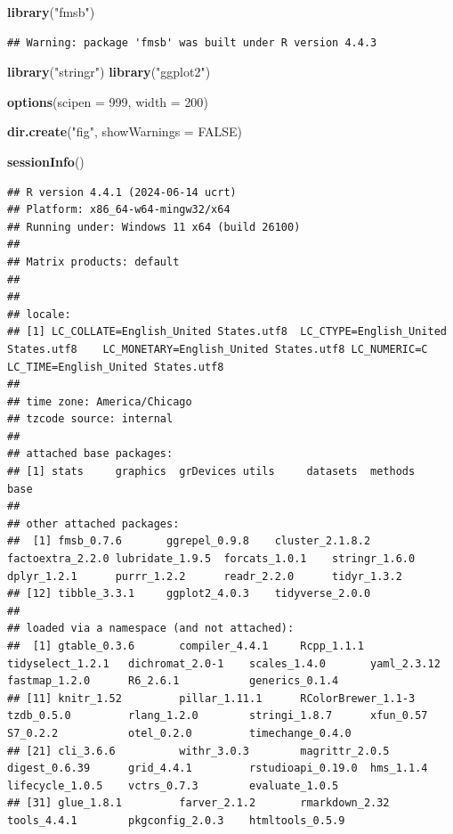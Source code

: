\documentclass[
]{article}
\newenvironment{Shaded}{\begin{snugshade}}{\end{snugshade}}
\newcommand{\AttributeTok}[1]{\textcolor[rgb]{0.13,0.29,0.53}{#1}}
\newcommand{\ConstantTok}[1]{\textcolor[rgb]{0.56,0.35,0.01}{#1}}
\newcommand{\DecValTok}[1]{\textcolor[rgb]{0.00,0.00,0.81}{#1}}
\newcommand{\FunctionTok}[1]{\textcolor[rgb]{0.13,0.29,0.53}{\textbf{#1}}}
\newcommand{\NormalTok}[1]{#1}
\newcommand{\StringTok}[1]{\textcolor[rgb]{0.31,0.60,0.02}{#1}}
\begin{document}
\begin{Shaded}
\begin{Highlighting}[]
\FunctionTok{library}\NormalTok{(}\StringTok{"fmsb"}\NormalTok{)}
\end{Highlighting}
\end{Shaded}

\begin{verbatim}
## Warning: package 'fmsb' was built under R version 4.4.3
\end{verbatim}

\begin{Shaded}
\begin{Highlighting}[]
\FunctionTok{library}\NormalTok{(}\StringTok{"stringr"}\NormalTok{)}
\FunctionTok{library}\NormalTok{(}\StringTok{"ggplot2"}\NormalTok{)}

\FunctionTok{options}\NormalTok{(}\AttributeTok{scipen =} \DecValTok{999}\NormalTok{, }\AttributeTok{width =} \DecValTok{200}\NormalTok{)}

\FunctionTok{dir.create}\NormalTok{(}\StringTok{"fig"}\NormalTok{, }\AttributeTok{showWarnings =} \ConstantTok{FALSE}\NormalTok{)}
\end{Highlighting}
\end{Shaded}

\begin{Shaded}
\begin{Highlighting}[]
\FunctionTok{sessionInfo}\NormalTok{()}
\end{Highlighting}
\end{Shaded}

\begin{verbatim}
## R version 4.4.1 (2024-06-14 ucrt)
## Platform: x86_64-w64-mingw32/x64
## Running under: Windows 11 x64 (build 26100)
## 
## Matrix products: default
## 
## 
## locale:
## [1] LC_COLLATE=English_United States.utf8  LC_CTYPE=English_United States.utf8    LC_MONETARY=English_United States.utf8 LC_NUMERIC=C                           LC_TIME=English_United States.utf8    
## 
## time zone: America/Chicago
## tzcode source: internal
## 
## attached base packages:
## [1] stats     graphics  grDevices utils     datasets  methods   base     
## 
## other attached packages:
##  [1] fmsb_0.7.6       ggrepel_0.9.8    cluster_2.1.8.2  factoextra_2.2.0 lubridate_1.9.5  forcats_1.0.1    stringr_1.6.0    dplyr_1.2.1      purrr_1.2.2      readr_2.2.0      tidyr_1.3.2     
## [12] tibble_3.3.1     ggplot2_4.0.3    tidyverse_2.0.0 
## 
## loaded via a namespace (and not attached):
##  [1] gtable_0.3.6       compiler_4.4.1     Rcpp_1.1.1         tidyselect_1.2.1   dichromat_2.0-1    scales_1.4.0       yaml_2.3.12        fastmap_1.2.0      R6_2.6.1           generics_0.1.4    
## [11] knitr_1.52         pillar_1.11.1      RColorBrewer_1.1-3 tzdb_0.5.0         rlang_1.2.0        stringi_1.8.7      xfun_0.57          S7_0.2.2           otel_0.2.0         timechange_0.4.0  
## [21] cli_3.6.6          withr_3.0.3        magrittr_2.0.5     digest_0.6.39      grid_4.4.1         rstudioapi_0.19.0  hms_1.1.4          lifecycle_1.0.5    vctrs_0.7.3        evaluate_1.0.5    
## [31] glue_1.8.1         farver_2.1.2       rmarkdown_2.32     tools_4.4.1        pkgconfig_2.0.3    htmltools_0.5.9
\end{verbatim}
\end{document}
